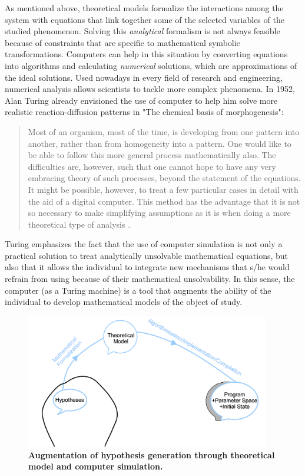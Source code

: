 As mentioned above, theoretical models formalize the interactions among the system with equations that link together some of the selected variables of the studied phenomenon. Solving this \textit{analytical} formalism is not always feasible because of constraints that are specific to mathematical symbolic transformations. Computers can help in this situation by converting equations into algorithms and calculating \textit{numerical} solutions, which are approximations of the ideal solutions. Used nowadays in every field of research and engineering, numerical analysis allows scientists to tackle more complex phenomena. In 1952, Alan Turing already envisioned the use of computer to help him solve more realistic reaction-diffusion patterns in "The chemical basis of morphogenesis":
\begin{quotation}  Most of an organism, most of the time, is developing from one pattern into another, rather than from homogeneity into a pattern. One would like to be able to follow this more general process mathematically also. The difficulties are, however, such that one cannot hope to have any very embracing theory of such processes, beyond the statement of the equations. It might be possible, however, to treat a few particular cases in detail with the aid of a digital computer. This method has the advantage that it is not so necessary to make simplifying assumptions as it is when doing a more theoretical type of analysis \cite{Turing:1952vn}. 
\end{quotation}

Turing emphasizes the fact that the use of computer simulation is not only a practical solution to treat analytically unsolvable mathematical equations, but also that it allows the individual to integrate new mechanisms that s/he would refrain from using because of their mathematical unsolvability. In this sense, the computer (as a Turing machine) is a tool that augments the ability of the individual to develop mathematical models of the object of study.
\begin{figure}
\begin{center}
\includegraphics[width=0.95\textwidth]{../../images/experimental_science/experimental_science_hypotheses_augmented2.png}
\end{center}
\caption{\textbf{Augmentation of hypothesis generation through theoretical model and computer simulation.}}
\label{experimental_science_hypotheses_augmented}
\end{figure}

